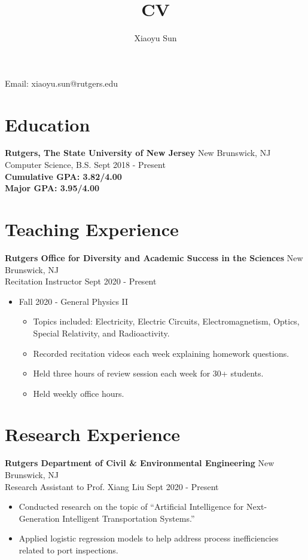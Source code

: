 \documentclass{article}
\makeatletter
\renewcommand{\maketitle}{
\begin{center}
{\huge\bfseries
\theauthor}

\vspace{.25em}

Email: xiaoyu.sun@rutgers.edu\\
\end{center}
}
\makeatother
\begin{document}
\title{CV}
\author{Xiaoyu Sun}
\maketitle

\section{Education}
\textbf{Rutgers, The State University of New Jersey} \space 
\hfill{New Brunswick, NJ}\\
Computer Science, B.S. \space
\hfill{Sept 2018 - Present}\\
\textbf{Cumulative GPA: 3.82/4.00}\\
\textbf{Major GPA: 3.95/4.00}


\section{Teaching Experience}
\textbf{Rutgers Office for Diversity and Academic Success in the Sciences}
\hfill{New Brunswick, NJ}\\
Recitation Instructor
\hfill{Sept 2020 - Present}
\begin{itemize}
  \item Fall 2020 - General Physics II
  \begin{itemize}
  	\item Topics included: Electricity, Electric Circuits, Electromagnetism, Optics, Special Relativity, and Radioactivity.
     \item Recorded recitation videos each week explaining homework questions.
     \item Held three hours of review session each week for 30+ students.
 	 \item Held weekly office hours.
  \end{itemize}
\end{itemize}


\section{Research Experience}
\textbf{Rutgers Department of Civil \& Environmental Engineering}
\hfill{New Brunswick, NJ}\\
Research Assistant to Prof. Xiang Liu
\hfill{Sept 2020 - Present}
\begin{itemize}
  \itemsep0em
  \item Conducted research on the topic of “Artificial Intelligence for Next-Generation Intelligent Transportation Systems.”
  \item Applied logistic regression models to help address process inefficiencies related to port inspections.
\end{itemize}
\end{document}
